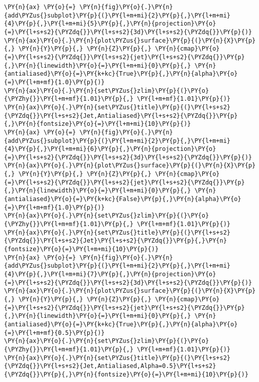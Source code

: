 \begin{tcolorbox}[breakable, size=fbox, boxrule=1pt, pad at break*=1mm,colback=cellbackground, colframe=cellborder]
\begin{Verbatim}[commandchars=\\\{\}]
\PY{n}{ax} \PY{o}{=} \PY{n}{fig}\PY{o}{.}\PY{n}{add\PYZus{}subplot}\PY{p}{(}\PY{l+m+mi}{2}\PY{p}{,}\PY{l+m+mi}{4}\PY{p}{,}\PY{l+m+mi}{5}\PY{p}{,}\PY{n}{projection}\PY{o}{=}\PY{l+s+s2}{\PYZdq{}}\PY{l+s+s2}{3d}\PY{l+s+s2}{\PYZdq{}}\PY{p}{)}
\PY{n}{ax}\PY{o}{.}\PY{n}{plot\PYZus{}surface}\PY{p}{(}\PY{n}{X}\PY{p}{,} \PY{n}{Y}\PY{p}{,} \PY{n}{Z}\PY{p}{,} \PY{n}{cmap}\PY{o}{=}\PY{l+s+s2}{\PYZdq{}}\PY{l+s+s2}{jet}\PY{l+s+s2}{\PYZdq{}}\PY{p}{,}\PY{n}{linewidth}\PY{o}{=}\PY{l+m+mi}{0}\PY{p}{,} \PY{n}{antialiased}\PY{o}{=}\PY{k+kc}{True}\PY{p}{,}\PY{n}{alpha}\PY{o}{=}\PY{l+m+mf}{1.0}\PY{p}{)}
\PY{n}{ax}\PY{o}{.}\PY{n}{set\PYZus{}zlim}\PY{p}{(}\PY{o}{\PYZhy{}}\PY{l+m+mf}{1.01}\PY{p}{,} \PY{l+m+mf}{1.01}\PY{p}{)}
\PY{n}{ax}\PY{o}{.}\PY{n}{set\PYZus{}title}\PY{p}{(}\PY{l+s+s2}{\PYZdq{}}\PY{l+s+s2}{Jet,Antialiased}\PY{l+s+s2}{\PYZdq{}}\PY{p}{,}\PY{n}{fontsize}\PY{o}{=}\PY{l+m+mi}{10}\PY{p}{)}
\PY{n}{ax} \PY{o}{=} \PY{n}{fig}\PY{o}{.}\PY{n}{add\PYZus{}subplot}\PY{p}{(}\PY{l+m+mi}{2}\PY{p}{,}\PY{l+m+mi}{4}\PY{p}{,}\PY{l+m+mi}{6}\PY{p}{,}\PY{n}{projection}\PY{o}{=}\PY{l+s+s2}{\PYZdq{}}\PY{l+s+s2}{3d}\PY{l+s+s2}{\PYZdq{}}\PY{p}{)}
\PY{n}{ax}\PY{o}{.}\PY{n}{plot\PYZus{}surface}\PY{p}{(}\PY{n}{X}\PY{p}{,} \PY{n}{Y}\PY{p}{,} \PY{n}{Z}\PY{p}{,} \PY{n}{cmap}\PY{o}{=}\PY{l+s+s2}{\PYZdq{}}\PY{l+s+s2}{jet}\PY{l+s+s2}{\PYZdq{}}\PY{p}{,}\PY{n}{linewidth}\PY{o}{=}\PY{l+m+mi}{0}\PY{p}{,} \PY{n}{antialiased}\PY{o}{=}\PY{k+kc}{False}\PY{p}{,}\PY{n}{alpha}\PY{o}{=}\PY{l+m+mf}{1.0}\PY{p}{)}
\PY{n}{ax}\PY{o}{.}\PY{n}{set\PYZus{}zlim}\PY{p}{(}\PY{o}{\PYZhy{}}\PY{l+m+mf}{1.01}\PY{p}{,} \PY{l+m+mf}{1.01}\PY{p}{)}
\PY{n}{ax}\PY{o}{.}\PY{n}{set\PYZus{}title}\PY{p}{(}\PY{l+s+s2}{\PYZdq{}}\PY{l+s+s2}{Jet}\PY{l+s+s2}{\PYZdq{}}\PY{p}{,}\PY{n}{fontsize}\PY{o}{=}\PY{l+m+mi}{10}\PY{p}{)}
\PY{n}{ax} \PY{o}{=} \PY{n}{fig}\PY{o}{.}\PY{n}{add\PYZus{}subplot}\PY{p}{(}\PY{l+m+mi}{2}\PY{p}{,}\PY{l+m+mi}{4}\PY{p}{,}\PY{l+m+mi}{7}\PY{p}{,}\PY{n}{projection}\PY{o}{=}\PY{l+s+s2}{\PYZdq{}}\PY{l+s+s2}{3d}\PY{l+s+s2}{\PYZdq{}}\PY{p}{)}
\PY{n}{ax}\PY{o}{.}\PY{n}{plot\PYZus{}surface}\PY{p}{(}\PY{n}{X}\PY{p}{,} \PY{n}{Y}\PY{p}{,} \PY{n}{Z}\PY{p}{,} \PY{n}{cmap}\PY{o}{=}\PY{l+s+s2}{\PYZdq{}}\PY{l+s+s2}{jet}\PY{l+s+s2}{\PYZdq{}}\PY{p}{,}\PY{n}{linewidth}\PY{o}{=}\PY{l+m+mi}{0}\PY{p}{,} \PY{n}{antialiased}\PY{o}{=}\PY{k+kc}{True}\PY{p}{,}\PY{n}{alpha}\PY{o}{=}\PY{l+m+mf}{0.5}\PY{p}{)}
\PY{n}{ax}\PY{o}{.}\PY{n}{set\PYZus{}zlim}\PY{p}{(}\PY{o}{\PYZhy{}}\PY{l+m+mf}{1.01}\PY{p}{,} \PY{l+m+mf}{1.01}\PY{p}{)}
\PY{n}{ax}\PY{o}{.}\PY{n}{set\PYZus{}title}\PY{p}{(}\PY{l+s+s2}{\PYZdq{}}\PY{l+s+s2}{Jet,Antialiased,Alpha=0.5}\PY{l+s+s2}{\PYZdq{}}\PY{p}{,}\PY{n}{fontsize}\PY{o}{=}\PY{l+m+mi}{10}\PY{p}{)}

\end{Verbatim}
\end{tcolorbox}
